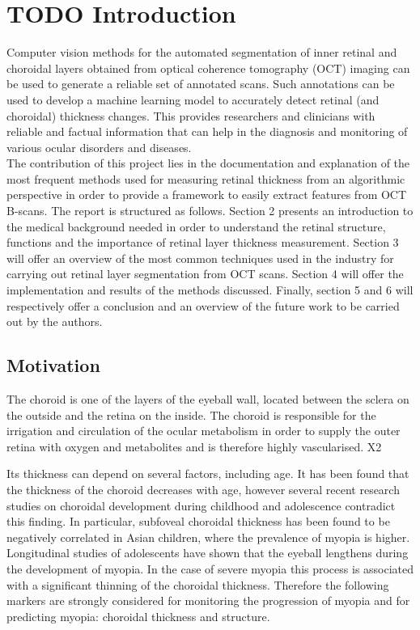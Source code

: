 \documentclass[12pt,a4paper]{scrartcl}
\begin{document}
\section{TODO Introduction}\label{s:introduction} 
Computer vision methods for the automated segmentation of inner retinal and choroidal layers obtained from optical coherence tomography (OCT) imaging \cite{Ronchetti2019statistic} can be used to generate a reliable set of annotated scans. Such annotations can be used to develop a machine learning model to accurately detect retinal (and choroidal) thickness changes.  This provides researchers and clinicians with reliable and factual information that can help in the diagnosis and monitoring of various ocular disorders and diseases. \\

The contribution of this project lies in the documentation and explanation of the most frequent methods used for measuring retinal thickness from an algorithmic perspective in order to provide a framework to easily extract features from OCT B-scans. The report is structured as follows. Section 2 presents an introduction to the medical background needed in order to understand the retinal structure, functions and the importance of retinal layer thickness measurement. Section 3 will offer an overview of the most common techniques used in the industry for carrying out retinal layer segmentation from OCT scans. Section 4 will offer the implementation and results of the methods discussed. Finally, section 5 and 6 will respectively offer a conclusion and an overview of the future work to be carried out by the authors. \\

\subsection{Motivation}
The choroid is one of the layers of the eyeball wall, located between the sclera on the outside and the retina on the inside. The choroid is responsible for the irrigation and circulation of the ocular metabolism in order to supply the outer retina with oxygen and metabolites and is therefore highly vascularised. X2

Its thickness can depend on several factors, including age. It has been found that the thickness of the choroid decreases with age, however several recent research studies on choroidal development during childhood and adolescence contradict this finding. In particular, subfoveal choroidal thickness has been found to be negatively correlated in Asian children, where the prevalence of myopia is higher. Longitudinal studies of adolescents have shown that the eyeball lengthens during the development of myopia. In the case of severe myopia this process is associated with a significant thinning of the choroidal thickness. Therefore the following markers are strongly considered for monitoring the progression of myopia and for predicting myopia: choroidal thickness and structure.
\end{document}
